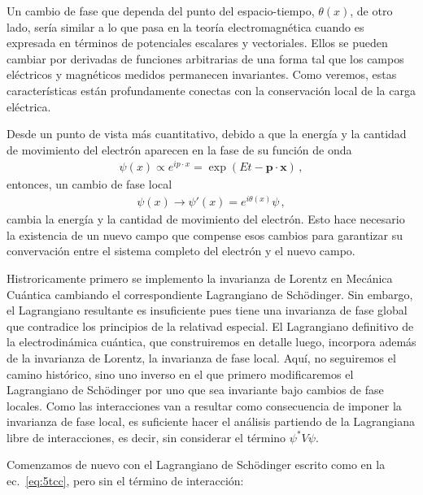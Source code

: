 Un cambio de fase que dependa del punto del espacio-tiempo, $\theta(x)$, de otro lado, sería similar a lo que pasa en la teoría electromagnética cuando es expresada en términos de potenciales escalares y vectoriales. Ellos se pueden cambiar por derivadas de funciones arbitrarias de una forma tal que los campos eléctricos y magnéticos medidos permanecen invariantes. Como veremos, estas características están profundamente conectas con la conservación local de la carga eléctrica.  

Desde un punto de vista más cuantitativo, debido a que la energía y la cantidad de movimiento del electrón aparecen  en la fase de su función de onda
\begin{align}
  \psi(x)\propto e^{i p\cdot x}=\exp(Et-\mathbf{p}\cdot \mathbf{x})\,,
\end{align}
entonces, un cambio de fase local
\begin{align}
 \psi(x)\to \psi'(x)=e^{{i\theta(x)}}\psi\,,
\end{align}
cambia la energía y la cantidad de movimiento del electrón. Esto hace necesario la existencia de un nuevo campo que compense esos cambios para garantizar su convervación entre el sistema completo del electrón y el nuevo campo.

Histroricamente primero se implemento la invarianza de Lorentz en Mecánica Cuántica cambiando el correspondiente Lagrangiano de Sch\"odinger. Sin embargo, el Lagrangiano resultante es insuficiente pues tiene una invarianza de fase global que contradice los principios de la relativad especial. El Lagrangiano definitivo de la electrodinámica cuántica, que construiremos en detalle luego, incorpora además de la invarianza de Lorentz, la invarianza de fase local. Aquí, no seguiremos el camino histórico, sino uno inverso en el  que primero modificaremos el Lagrangiano de Sch\"odinger por uno que sea invariante bajo cambios de fase locales. Como las interacciones van a resultar como consecuencia de imponer la invarianza de fase local, es suficiente hacer el análisis partiendo de la Lagrangiana libre de interacciones, es decir, sin considerar el término $\psi^{*}V\psi$.

Comenzamos de nuevo con el Lagrangiano de Schödinger escrito como en la ec.~\eqref{eq:5tcc}, pero sin el término de interacción:

